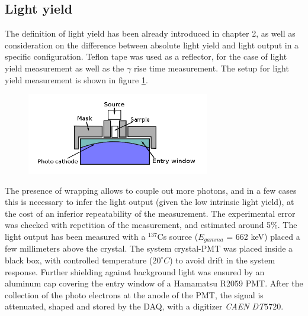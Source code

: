 \subsection{Light yield}
The definition of light yield has been already introduced in chapter 2, as well as consideration on the difference between absolute light yield and light output in a specific configuration.
Teflon tape was used as a reflector, for the case of light yield measurement as well as the $\gamma$ rise time measurement. The setup for light yield measurement is shown in figure \ref{fig:set_LY}. 
\begin{figure}[htbp]
\begin{center}
\includegraphics[width=8cm]{../Pictures/Chapter_5/LY_3.png}
\end{center}
\caption[]{}
\label{fig:set_LY}
\end{figure}
The presence of wrapping allows to couple out more photons, and in a few cases this is necessary to infer the light output (given the low intrinsic light yield), at the cost of an inferior repeatability of the measurement. The experimental error was checked with repetition of the measurement, and estimated around 5$\%$.
The light output has been measured with a $^{137}$Cs source ($E_{gamma}$ = 662 keV) placed a few millimeters above the crystal. The system crystal-PMT was placed inside a black box, with controlled temperature ($20^{\circ}C$) to avoid drift in the system response.
Further shielding against background light was ensured by an aluminum cap covering the entry window of a Hamamatsu R2059 PMT.
After the collection of the photo electrons at the anode of the PMT, the signal is attenuated, shaped and stored by the DAQ, with a digitizer \textit{CAEN DT$5720$}.

